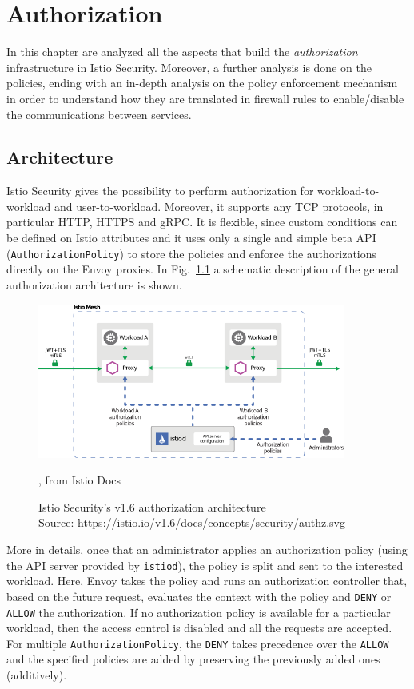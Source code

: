 \chapter{Authorization}
In this chapter are analyzed all the aspects that build the \textit{authorization} infrastructure in Istio Security. Moreover, a further analysis is done on the policies, ending with an in-depth analysis on the policy enforcement mechanism in order to understand how they are translated in firewall rules to enable/disable the communications between services.
\minitoc

\section{Architecture}
Istio Security gives the possibility to perform authorization for workload-to-workload and user-to-workload. Moreover, it supports any TCP protocols, in particular HTTP, HTTPS and gRPC. It is flexible, since custom conditions can be defined on Istio attributes and it uses only a single and simple beta API (\texttt{AuthorizationPolicy}) to store the policies and enforce the authorizations directly on the Envoy proxies.
In Fig.~\ref{fig:archauthz} a schematic description of the general authorization architecture is shown.

\begin{figure}[ht]
    \centering
    \includegraphics[width=0.9\textwidth]{chapters/images/chp3/arch-authz.png}
    \caption{, from Istio Docs}
    \caption[Istio Security's v1.6 authorization architecture]{Istio Security's v1.6 authorization architecture\\Source: \url{https://istio.io/v1.6/docs/concepts/security/authz.svg}}
    \label{fig:archauthz}
\end{figure}

More in details, once that an administrator applies an authorization policy (using the API server provided by \texttt{istiod}), the policy is split and sent to the interested workload. Here, Envoy takes the policy and runs an authorization controller that, based on the future request, evaluates the context with the policy and \texttt{DENY} or \texttt{ALLOW} the authorization. If no authorization policy is available for a particular workload, then the access control is disabled and all the requests are accepted. For multiple \texttt{AuthorizationPolicy}, the \texttt{DENY} takes precedence over the \texttt{ALLOW} and the specified policies are added by preserving the previously added ones (additively).

